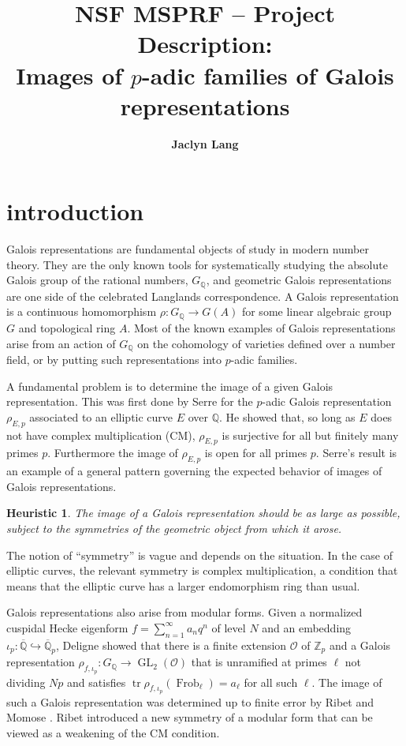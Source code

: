 \documentclass[11pt]{amsart}
\title{NSF MSPRF -- Project Description: \\  {Images of \MakeLowercase{$p$}-adic families of Galois representations}}
\author{\textbf{Jaclyn Lang}}
\newtheorem*{heuristic}{Heuristic}
\theoremstyle{definition}
\theoremstyle{remark}
\DeclareMathOperator{\Frob}{Frob}
\DeclareMathOperator{\tr}{tr}
\def\OK{\mathcal{O}}
\def\Q{\mathbb{Q}}
\def\Z{\mathbb{Z}}
\DeclareMathOperator{\GL}{GL}
\begin{document}
\maketitle
\section*{introduction}
Galois representations are fundamental objects of study in modern number theory.  They are the only known tools for systematically studying the absolute Galois group of the rational numbers, $G_\Q$, and geometric Galois representations are one side of the celebrated Langlands correspondence.  A Galois representation is a continuous homomorphism $\rho : G_\Q \to G(A)$ for some linear algebraic group  $G$ and topological ring $A$.  Most of the known examples of Galois representations arise from an action of $G_\Q$ on the cohomology of varieties defined over a number field, or by putting such representations into $p$-adic families.  

A fundamental problem is to determine the image of a given Galois representation.  This was first done by Serre \cite{Serre68} for the $p$-adic Galois representation $\rho_{E, p}$ associated to an elliptic curve $E$ over $\Q$.  He showed that, so long as $E$ does not have complex multiplication (CM), $\rho_{E, p}$ is surjective for all but finitely many primes $p$.  Furthermore the image of $\rho_{E, p}$ is open for all primes $p$.  Serre's result is an example of a general pattern governing the expected behavior of images of Galois representations.

\begin{heuristic}
The image of a Galois representation should be as large as possible, subject to the symmetries of the geometric object from which it arose.
\end{heuristic}

The notion of ``symmetry'' is vague and depends on the situation.  In the case of elliptic curves, the relevant symmetry is complex multiplication, a condition that means that the elliptic curve has a larger endomorphism ring than usual.  

Galois representations also arise from modular forms.  Given a normalized cuspidal Hecke eigenform $f = \sum_{n = 1}^\infty a_nq^n$ of level $N$ and an embedding $\iota_p : \overline{\Q} \hookrightarrow \overline{\Q}_p$, Deligne \cite{Deligne71} showed that there is a finite extension $\OK$ of $\Z_p$ and a Galois representation $\rho_{f, \iota_p} : G_\Q \to \GL_2(\OK)$ that is unramified at primes $\ell$ not dividing $Np$ and satisfies $\tr \rho_{f, \iota_p}(\Frob_\ell) = a_\ell$ for all such $\ell$.  The image of such a Galois representation was determined up to finite error by Ribet and Momose \cite{Momose81, Ribet83}.  Ribet introduced a new symmetry of a modular form that can be viewed as a weakening of the CM condition.
\end{document}
